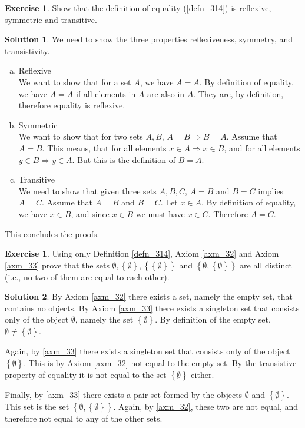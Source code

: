 \documentclass[a4paper, twocolumn]{report}
\newcounter{exercise} \numberwithin{exercise}{section}
\theoremstyle{definition}
\newtheorem{exc}[exercise]{Exercise}
\theoremstyle{solution}
\newtheorem*{sltn}{Solution}
\begin{document}
\begin{exc}
  Show that the definition of equality (\ref{defn_314}) is reflexive, symmetric
  and transitive. 
\end{exc}
\begin{sltn}
  We need to show the three properties reflexiveness, symmetry, and transistivity.  
  \begin{enumerate}[(a)]
    \item Reflexive \\
      [0.2cm]
      We want to show that for a set $A$, we have $A = A$.
      By definition of equality, we have $A = A$ if all elements in $A$ are also in $A$.
      They are, by definition, therefore equality is reflexive.
    \item Symmetric \\
      [0.2cm]
      We want to show that for two sets $A, B$, $A = B \Longrightarrow B = A$.
      Assume that $A = B$. This means, that for all elements $x \in A \Longrightarrow x \in B$, and
      for all elements $y \in B \Longrightarrow y \in A$. But this is the definition of $B = A$.
    \item Transitive \\
      [0.2cm]
      We need to show that given three sets $A, B, C$, $A = B$ and $B = C$
      implies $A = C$.  Assume that $A = B$ and $B = C$. Let $x \in A$. By
      definition of equality, we have $x \in B$, and since $x \in B$ we must
      have $x \in C$. Therefore $A = C$.
  \end{enumerate}
  This concludes the proofs.
\end{sltn}

\begin{exc}
  Using only Definition \ref{defn_314}, Axiom \ref{axm_32} and Axiom
  \ref{axm_33} prove that the sets $\emptyset, \left\{ \emptyset \right\},
  \left\{ \left\{ \emptyset\right\} \right\}$ and $\left\{ \emptyset, \left\{
  \emptyset \right\}  \right\}$ are all distinct (i.e., no two of them are
  equal to each other).
\end{exc}

\begin{sltn}
  By Axiom \ref{axm_32} there exists a set, namely the empty set, that contains
  no objects.  By Axiom \ref{axm_33} there exists a singleton set that consists
  only of the object $\emptyset$, namely the set $\left\{ \emptyset \right\}$.
  By definition of the empty set, $\emptyset \neq \left\{ \emptyset \right\}$.

  Again, by \ref{axm_33} there exists a singleton set that consists only of the
  object $\left\{ \emptyset \right\}$.  This is by Axiom \ref{axm_32} not equal
  to the empty set. By the transistive property of equality it is not equal to
  the set $\left\{ \emptyset \right\}$ either.

  Finally, by \ref{axm_33} there exists a pair set formed by the objects
  $\emptyset$ and $\left\{ \emptyset \right\}$.  This set is the set $\left\{
  \emptyset, \left\{ \emptyset \right\} \right\}$. Again, by \ref{axm_32},
  these two are not equal, and therefore not equal to any of the other sets.

\end{sltn}
\end{document}
